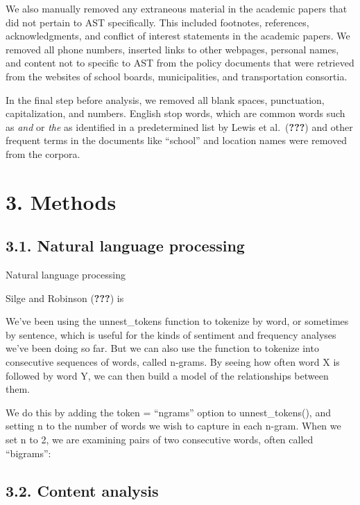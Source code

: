 \documentclass[]{elsarticle} %
\begin{document}
We also manually removed any extraneous material in the academic papers
that did not pertain to AST specifically. This included footnotes,
references, acknowledgments, and conflict of interest statements in the
academic papers. We removed all phone numbers, inserted links to other
webpages, personal names, and content not to specific to AST from the
policy documents that were retrieved from the websites of school boards,
municipalities, and transportation consortia.

In the final step before analysis, we removed all blank spaces,
punctuation, capitalization, and numbers. English stop words, which are
common words such as \emph{and} or \emph{the} as identified in a
predetermined list by Lewis et al.~({\textbf{???}}) and other frequent
terms in the documents like ``school'' and location names were removed
from the corpora.

\hypertarget{methods}{%
\section{3. Methods}\label{methods}}

\hypertarget{natural-language-processing}{%
\subsection{3.1. Natural language
processing}\label{natural-language-processing}}

Natural language processing

Silge and Robinson ({\textbf{???}}) is

We've been using the unnest\_tokens function to tokenize by word, or
sometimes by sentence, which is useful for the kinds of sentiment and
frequency analyses we've been doing so far. But we can also use the
function to tokenize into consecutive sequences of words, called
n-grams. By seeing how often word X is followed by word Y, we can then
build a model of the relationships between them.

We do this by adding the token = ``ngrams'' option to unnest\_tokens(),
and setting n to the number of words we wish to capture in each n-gram.
When we set n to 2, we are examining pairs of two consecutive words,
often called ``bigrams'':

\hypertarget{content-analysis}{%
\subsection{3.2. Content analysis}\label{content-analysis}}
\end{document}
